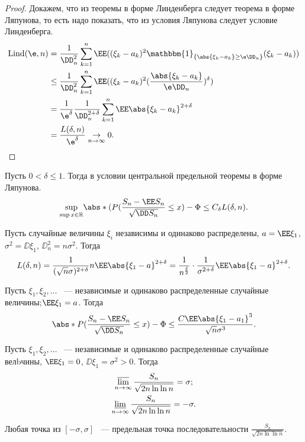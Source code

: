  \begin{proof}
     Докажем, что из теоремы в форме Линденберга следует теорема в форме Ляпунова, то есть надо показать, что из условия Ляпунова следует условие Линденберга.
     \begin{align*}
         \text{Lind}(\e, n) &= \frac{1}{ \DD_n^2} \sum\limits_{k=1} ^ n  \EE ((\xi_k - a_k)^2\mathbbm{1}_{\{\abs{\xi_k - a_k}\ge \e \DD_n\}}(\xi_k - a_k)) \\&\le \frac{1}{ \DD_n^2} \sum\limits_{k=1} ^ n  \EE ((\xi_k - a_k)^2(\frac{\abs{\xi_k - a_k}}{\e \DD_n})^\delta) \\&= \frac{1}{\e^\delta}\frac{1}{ \DD_n^{2+\delta}} \sum\limits_{k=1} ^ n  \EE \abs{\xi_k - a_k}^{2+\delta} \\&= \frac{L(\delta, n)}{\e^\delta}\underset{n\rightarrow \infty}{\rightarrow} 0.
     \end{align*}
 \end{proof}

 \begin{theorem}
     Пусть $0<\delta \le 1$. Тогда в условии центральной предельной теоремы в форме Ляпунова.
$$\underset{\sup x\in \mathbb{R}}{\sup} \abs*{(P(\frac{S_n - \EE S_n}{\sqrt{ \DD S_n}}\le x) - \Phi}\le C_\delta L(\delta, n).$$
 \end{theorem}

 \begin{remark}
     Пусть случайные величины $\xi_i$ независимы и одинаково распределены, $a = \EE \xi_1$, $\sigma^2 =  \DD \xi_1$, $ \DD_n^2 = n\sigma^2$. Тогда
     $$L(\delta, n) = \frac{1}{(\sqrt{n}\sigma)^{2+\delta}}n\EE \abs{\xi_1 -a}^{2+\delta} = \frac{1}{n^{\frac{\delta}{2}}}\cdot \frac{1}{\sigma^{2+\delta}}\EE \abs{\xi_1 - a}^{2+\delta}.$$
 \end{remark}

 \begin{theorem}
Пусть $\xi_1, \xi_2, \ldots$ ~--- независимые и одинаково распределенные случайные величины;$\EE \xi_1 = a$. Тогда 
$$\abs*{P(\frac{S_n - \EE S_n}{\sqrt{ \DD S_n}}\le x) - \Phi} \le \frac{C\EE \abs{\xi_1 - a_1}^3}{\sqrt{n}\sigma^3}.$$
 \end{theorem}


 \begin{theorem}
Пусть $\xi_1, \xi_2, \ldots$ ~--- независимые и одинаково распределенные случайные велbчины, $\EE \xi_1 = 0$, $ \DD\xi_1 =\sigma^2 > 0$.
     Тогда 
     \begin{gather*}
         \varlimsup_{n \to \infty} \frac{S_n}{\sqrt{2n\ln\ln n}} = \sigma;\\
         \varliminf_{n \to \infty} \frac{S_n}{\sqrt{2n\ln\ln n}} = -\sigma.
     \end{gather*}
 \end{theorem}

 \begin{theorem}[Штрассена]
     Любая точка из $[-\sigma, \sigma]$ ~--- предельная точка последовательности $\frac{S_n}{\sqrt{2n\ln\ln n}}$.
 \end{theorem}

